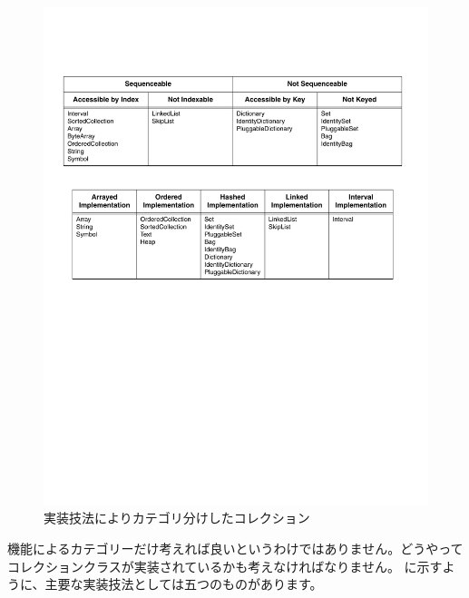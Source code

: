 \documentclass[a4paper,10pt,twoside]{book}
\begin{document}
\begin{figure}
\begin{center}
\includegraphics[width=\textwidth]{CollectionsByImpl}
\caption{実装技法によりカテゴリ分けしたコレクション
    }
\end{center}
\end{figure}

機能によるカテゴリーだけ考えれば良いというわけではありません。どうやってコレクションクラスが実装されているかも考えなければなりません。 に示すように、主要な実装技法としては五つのものがあります。
\end{document}

